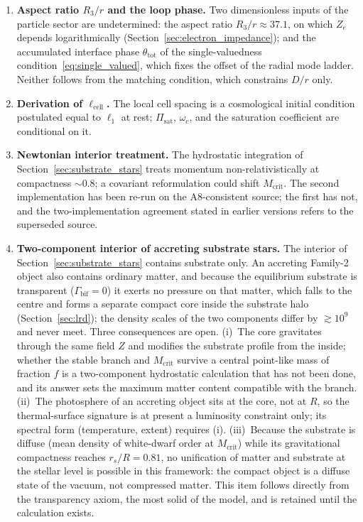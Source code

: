 \documentclass[11pt,a4paper]{article}
\theoremstyle{plain}
\theoremstyle{remark}
\begin{document}
\begin{enumerate}
    \item \textbf{Aspect ratio $R_3/r$ and the loop phase.} Two dimensionless inputs of the particle sector are undetermined: the aspect ratio $R_3/r \approx 37.1$, on which $Z_e$ depends logarithmically (Section~\ref{sec:electron_impedance}); and the accumulated interface phase $\theta_{\text{tot}}$ of the single-valuedness condition~\eqref{eq:single_valued}, which fixes the offset of the radial mode ladder. Neither follows from the matching condition, which constrains $D/r$ only.
    \item \textbf{Derivation of $\ell_{\text{cell}}$.} The local cell spacing is a cosmological initial condition postulated equal to $\ell_1$ at rest; $\Pi_{\text{sat}}$, $\omega_c$, and the saturation coefficient are conditional on it.
    \item \textbf{Newtonian interior treatment.} The hydrostatic integration of Section~\ref{sec:substrate_stars} treats momentum non-relativistically at compactness $\sim0.8$; a covariant reformulation could shift $M_{\text{crit}}$. The second implementation has been re-run on the A8-consistent source; the first has not, and the two-implementation agreement stated in earlier versions refers to the superseded source.
    \item \textbf{Two-component interior of accreting substrate stars.} The interior of Section~\ref{sec:substrate_stars} contains substrate only. An accreting Family-2 object also contains ordinary matter, and because the equilibrium substrate is transparent ($\Gamma_{\text{bif}} = 0$) it exerts no pressure on that matter, which falls to the centre and forms a separate compact core inside the substrate halo (Section~\ref{sec:lrd}); the density scales of the two components differ by $\gtrsim 10^{9}$ and never meet. Three consequences are open. (i)~The core gravitates through the same field $Z$ and modifies the substrate profile from the inside; whether the stable branch and $M_{\text{crit}}$ survive a central point-like mass of fraction $f$ is a two-component hydrostatic calculation that has not been done, and its answer sets the maximum matter content compatible with the branch. (ii)~The photosphere of an accreting object sits at the core, not at $R$, so the thermal-surface signature is at present a luminosity constraint only; its spectral form (temperature, extent) requires (i). (iii)~Because the substrate is diffuse (mean density of white-dwarf order at $M_{\text{crit}}$) while its gravitational compactness reaches $r_s/R = 0.81$, no unification of matter and substrate at the stellar level is possible in this framework: the compact object is a diffuse state of the vacuum, not compressed matter. This item follows directly from the transparency axiom, the most solid of the model, and is retained until the calculation exists.

\end{enumerate}
\end{document}
